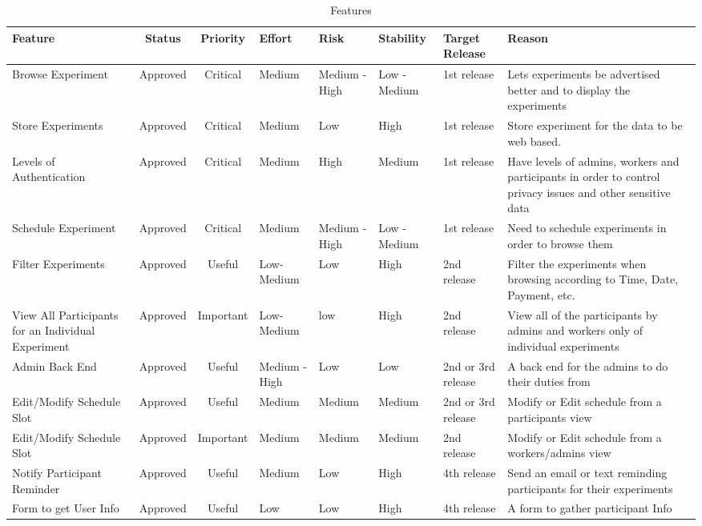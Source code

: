 \documentclass[11pt]{article}
\begin{document}
\pagestyle{empty}
\begin{table}
  \footnotesize
  \caption{Features}
    \begin{tabular}{| p{2.5cm} | c | c | p{1.25cm} | p{1.5cm} | p{1.5cm} | p{1.25cm} | p{3.25cm}|}
    \hline
    Feature & Status & Priority & Effort & Risk  & Stability & Target Release & Reason \\
    \hline
    Browse Experiment & Approved & Critical & Medium & Medium - High & Low - Medium & 1st release & Lets experiments be advertised better and to display the experiments \\
    \hline
    Store Experiments & Approved & Critical & Medium & Low   & High  & 1st release & Store experiment for the data to be web based. \\
    \hline
    Levels of Authentication & Approved & Critical & Medium & High  & Medium & 1st release  & Have levels of admins, workers and participants in order to control privacy issues and other sensitive data \\
    \hline
    Schedule Experiment & Approved & Critical & Medium & Medium - High & Low - Medium & 1st release   & Need to schedule experiments in order to browse them \\
    \hline
    Filter Experiments & Approved & Useful & Low-Medium & Low   & High  & 2nd release & Filter the experiments when browsing according to Time, Date, Payment, etc. \\
    \hline
    View All Participants for an Individual Experiment & Approved & Important & Low-Medium & low   & High  & 2nd release  & View all of the participants by admins and workers only of individual experiments \\
    \hline
    Admin Back End & Approved & Useful & Medium - High & Low   & Low   & 2nd or 3rd release  & A back end for the admins to do their duties from \\
    \hline
    Edit/Modify Schedule Slot & Approved & Useful & Medium & Medium & Medium & 2nd or 3rd release   & Modify or Edit schedule from a participants view \\
    \hline
    Edit/Modify Schedule Slot & Approved & Important & Medium & Medium & Medium & 2nd release  & Modify or Edit schedule from a workers/admins view \\
    \hline
    Notify Participant Reminder & Approved & Useful & Medium & Low   & High  & 4th release  & Send an email or text reminding participants for their experiments \\
    \hline
    Form to get User Info & Approved & Useful & Low   & Low   & High  & 4th release  & A form to gather participant Info \\

\end{tabular}
\end{table}
\end{document}

